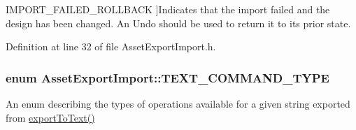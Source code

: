 \begin{Desc}
\begin{description}
{\hypertarget{class_asset_export_import_aca4cd77d57caadb60bc50edc33ca3d9ead8177ff757d543d6b6f3d9ca8d5dddbf}{I\-M\-P\-O\-R\-T\-\_\-\-F\-A\-I\-L\-E\-D\-\_\-\-R\-O\-L\-L\-B\-A\-C\-K}\label{class_asset_export_import_aca4cd77d57caadb60bc50edc33ca3d9ead8177ff757d543d6b6f3d9ca8d5dddbf}
}]Indicates that the import failed and the design has been changed. An Undo should be used to return it to its prior state. \end{description}
\end{Desc}


Definition at line 32 of file Asset\-Export\-Import.\-h.

\hypertarget{class_asset_export_import_a37d3ee8f821ba2e32f16705c7c471d7e}{
\subsubsection[{T\-E\-X\-T\-\_\-\-C\-O\-M\-M\-A\-N\-D\-\_\-\-T\-Y\-P\-E}]{\setlength{\rightskip}{0pt plus 5cm}enum {\bf Asset\-Export\-Import\-::\-T\-E\-X\-T\-\_\-\-C\-O\-M\-M\-A\-N\-D\-\_\-\-T\-Y\-P\-E}}}\label{class_asset_export_import_a37d3ee8f821ba2e32f16705c7c471d7e}


An enum describing the types of operations available for a given string exported from \hyperlink{class_asset_export_import_a164a5810ba088a4577ecb5e7b81a12ef}{export\-To\-Text()} 

